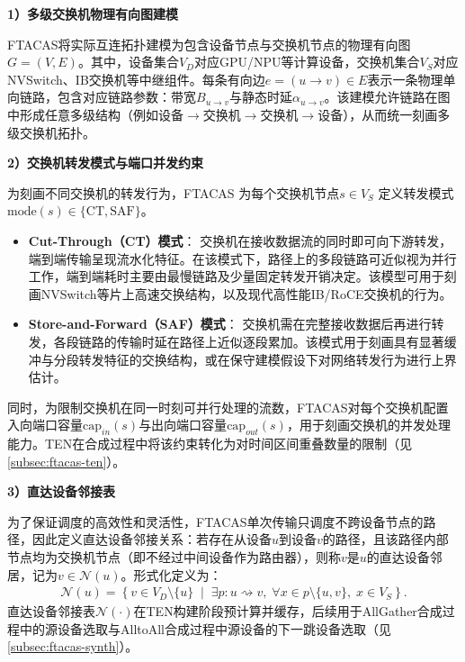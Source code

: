 \noindent\quad\textbf{1）多级交换机物理有向图建模}

FTACAS将实际互连拓扑建模为包含设备节点与交换机节点的物理有向图$G=(V,E)$。其中，设备集合$V_D$对应GPU/NPU等计算设备，交换机集合$V_S$对应NVSwitch、IB交换机等中继组件。每条有向边$e=(u\rightarrow v)\in E$表示一条物理单向链路，包含对应链路参数：带宽$B_{u\rightarrow v}$与静态时延$\alpha_{u\rightarrow v}$。该建模允许链路在图中形成任意多级结构（例如设备$\rightarrow$交换机$\rightarrow$交换机$\rightarrow$设备），从而统一刻画多级交换机拓扑。

\noindent\quad\textbf{2）交换机转发模式与端口并发约束}

为刻画不同交换机的转发行为，FTACAS 为每个交换机节点$s\in V_S$ 定义转发模式$\mathrm{mode}(s)\in\{\mathrm{CT},\mathrm{SAF}\}$。

\begin{itemize}
    \item \textbf{Cut-Through（CT）模式}：
    交换机在接收数据流的同时即可向下游转发，端到端传输呈现流水化特征。在该模式下，路径上的多段链路可近似视为并行工作，端到端耗时主要由最慢链路及少量固定转发开销决定。该模型可用于刻画NVSwitch等片上高速交换结构，以及现代高性能IB/RoCE交换机的行为。

    \item \textbf{Store-and-Forward（SAF）模式}：
    交换机需在完整接收数据后再进行转发，各段链路的传输时延在路径上近似逐段累加。该模式用于刻画具有显著缓冲与分段转发特征的交换结构，或在保守建模假设下对网络转发行为进行上界估计。
\end{itemize}

同时，为限制交换机在同一时刻可并行处理的流数，FTACAS对每个交换机配置入向端口容量$\mathrm{cap}_{in}(s)$与出向端口容量$\mathrm{cap}_{out}(s)$，用于刻画交换机的并发处理能力。TEN在合成过程中将该约束转化为对时间区间重叠数量的限制（见\autoref{subsec:ftacas-ten}）。

\noindent\quad\textbf{3）直达设备邻接表}

为了保证调度的高效性和灵活性，FTACAS单次传输只调度不跨设备节点的路径，因此定义直达设备邻接关系：若存在从设备$u$到设备$v$的路径，且该路径内部节点均为交换机节点（即不经过中间设备作为路由器），则称$v$是$u$的直达设备邻居，记为$v\in\mathcal{N}(u)$。形式化定义为：
\begin{align}
\mathcal{N}(u)=\left\{v\in V_D\setminus\{u\}\;\middle|\;\exists p:u\rightsquigarrow v,\;\forall x\in p\setminus\{u,v\},\;x\in V_S\right\}. \label{eq:ftacas-neighbor-def}
\end{align}
直达设备邻接表$\mathcal{N}(\cdot)$在TEN构建阶段预计算并缓存，后续用于AllGather合成过程中的源设备选取与AlltoAll合成过程中源设备的下一跳设备选取（见\autoref{subsec:ftacas-synth}）。



